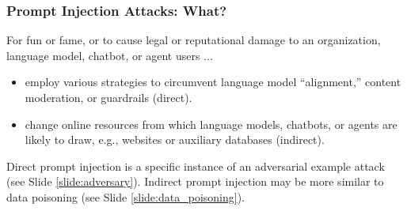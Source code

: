 \documentclass[11pt,
               aspectratio=169,
               hyperref={colorlinks}
               ]{beamer}
\begin{document}
			\begin{frame}
	
				\frametitle{Prompt Injection Attacks: \textbf{What?}}	
				
				\indent For fun or fame, or to cause legal or reputational damage to an organization, language model, chatbot, or agent users ... 
				
				\begin{itemize}
					\item employ various strategies to circumvent language model ``alignment,'' content moderation, or guardrails (direct). 
					\item change online resources from which language models, chatbots, or agents are likely to draw, e.g., websites or auxiliary databases (indirect). 
				\end{itemize}
					
				Direct prompt injection is a specific instance of an adversarial example attack (see Slide \ref{slide:adversary}). Indirect prompt injection may be more similar to data poisoning (see Slide \ref{slide:data_poisoning}). 

			\end{frame}
\end{document}
